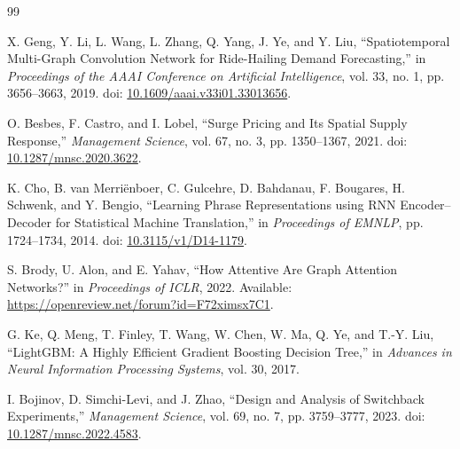 \documentclass[a4paper,10pt,twocolumn]{article}
\begin{document}
\begin{thebibliography}{99}
\small

X. Geng, Y. Li, L. Wang, L. Zhang, Q. Yang, J. Ye, and Y. Liu,
``Spatiotemporal Multi-Graph Convolution Network for Ride-Hailing Demand
Forecasting,'' in \textit{Proceedings of the AAAI Conference on Artificial
Intelligence}, vol. 33, no. 1, pp. 3656--3663, 2019.
doi: \href{https://doi.org/10.1609/aaai.v33i01.33013656}{10.1609/aaai.v33i01.33013656}.

O. Besbes, F. Castro, and I. Lobel, ``Surge Pricing and Its Spatial Supply
Response,'' \textit{Management Science}, vol. 67, no. 3, pp. 1350--1367,
2021. doi:
\href{https://doi.org/10.1287/mnsc.2020.3622}{10.1287/mnsc.2020.3622}.

K. Cho, B. van Merri\"enboer, C. Gulcehre, D. Bahdanau, F. Bougares,
H. Schwenk, and Y. Bengio, ``Learning Phrase Representations using RNN
Encoder--Decoder for Statistical Machine Translation,'' in
\textit{Proceedings of EMNLP}, pp. 1724--1734, 2014.
doi: \href{https://doi.org/10.3115/v1/D14-1179}{10.3115/v1/D14-1179}.

S. Brody, U. Alon, and E. Yahav, ``How Attentive Are Graph Attention
Networks?'' in \textit{Proceedings of ICLR}, 2022.
Available: \url{https://openreview.net/forum?id=F72ximsx7C1}.

G. Ke, Q. Meng, T. Finley, T. Wang, W. Chen, W. Ma, Q. Ye, and T.-Y. Liu,
``LightGBM: A Highly Efficient Gradient Boosting Decision Tree,'' in
\textit{Advances in Neural Information Processing Systems}, vol. 30, 2017.

I. Bojinov, D. Simchi-Levi, and J. Zhao, ``Design and Analysis of Switchback
Experiments,'' \textit{Management Science}, vol. 69, no. 7,
pp. 3759--3777, 2023. doi:
\href{https://doi.org/10.1287/mnsc.2022.4583}{10.1287/mnsc.2022.4583}.

\end{thebibliography}
\end{document}

